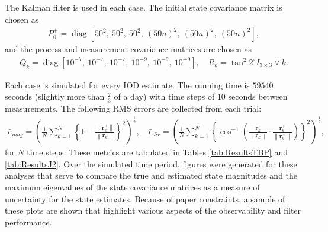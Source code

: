 \documentclass[letterpaper, paper,10pt]{AAS}		%
\newcommand{\diag}{\mathop{\mathrm{diag}}\nolimits}
\newcommand{\norm}[1]{\ensuremath{\left\| #1 \right\|}}
\renewcommand{\r}{\mathbf{r}}
\begin{document}
The Kalman filter is used in each case. The initial state covariance matrix is chosen as
\begin{align*}
P_0^+=\diag[50^2,\ 50^2,\ 50^2,\ (50n)^2,\ (50n)^2,\ (50n)^2],
\end{align*}
and the process and measurement covariance matrices are chosen as
\begin{align*}
Q_k=\diag[10^{-7},\ 10^{-7},\ 10^{-7},\ 10^{-9},\ 10^{-9},\ 10^{-9}], \quad R_k=\tan^2{2^\circ}I_{3\times3}\ \forall\ k.
\end{align*}

Each case is simulated for every IOD estimate. The running time is $59540$ seconds (slightly more than $\frac23$ of a day) with time steps of $10$ seconds between measurements. The following RMS errors are collected from each trial:
\begin{align}
\bar e_{mag}=\left(\frac1N\sum_{k=1}^N\left\{1-{\frac{\norm{\r^+_k}}{\norm{\r_k}}}\right\}^2\right)^{\frac12}, \quad \bar e_{dir}=\left(\frac1N\sum_{k=1}^N
\left\{\cos^{-1}\left(\frac{\r_k}{\norm{\r_k}}\cdot \frac{\r^+_k}{\norm{\r^+_k}}\right)\right\}^{2}
\right)^{\frac12},
\end{align}
for $N$ time steps.
These metrics are tabulated in Tables \ref{tab:ResultsTBP} and \ref{tab:ResultsJ2}.
Over the simulated time period, figures were generated for these analyses that  serve to compare the true and estimated state magnitudes and the maximum eigenvalues of the state covariance matrices as a measure of uncertainty for the state estimates.
Because of paper constraints, a sample of these plots are shown that highlight various aspects of the observability and filter performance.



\end{document}
